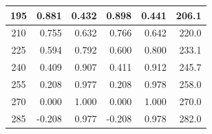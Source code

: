 \begin{table}[htbp]
\begin{center}
\begin{tabular}{|p{15 mm}|p{15 mm}|p{15 mm}|p{15 mm}|p{15 mm}|p{15 mm}|}
            \multicolumn{1}{|c|}{195}                  & \multicolumn{1}{|r|}{0.881}                                   & \multicolumn{1}{|r|}{0.432}                                   & \multicolumn{1}{|r|}{0.898}                & \multicolumn{1}{|r|}{0.441}                & \multicolumn{1}{|r|}{206.1}                    \\ \hline
            \multicolumn{1}{|c|}{210}                  & \multicolumn{1}{|r|}{0.755}                                   & \multicolumn{1}{|r|}{0.632}                                   & \multicolumn{1}{|r|}{0.766}                & \multicolumn{1}{|r|}{0.642}                & \multicolumn{1}{|r|}{220.0}                    \\ \hline
            \multicolumn{1}{|c|}{225}                  & \multicolumn{1}{|r|}{0.594}                                   & \multicolumn{1}{|r|}{0.792}                                   & \multicolumn{1}{|r|}{0.600}                & \multicolumn{1}{|r|}{0.800}                & \multicolumn{1}{|r|}{233.1}                    \\ \hline
            \multicolumn{1}{|c|}{240}                  & \multicolumn{1}{|r|}{0.409}                                   & \multicolumn{1}{|r|}{0.907}                                   & \multicolumn{1}{|r|}{0.411}                & \multicolumn{1}{|r|}{0.912}                & \multicolumn{1}{|r|}{245.7}                    \\ \hline
            \multicolumn{1}{|c|}{255}                  & \multicolumn{1}{|r|}{0.208}                                   & \multicolumn{1}{|r|}{0.977}                                   & \multicolumn{1}{|r|}{0.208}                & \multicolumn{1}{|r|}{0.978}                & \multicolumn{1}{|r|}{258.0}                    \\ \hline
            \multicolumn{1}{|c|}{270}                  & \multicolumn{1}{|r|}{0.000}                                   & \multicolumn{1}{|r|}{1.000}                                   & \multicolumn{1}{|r|}{0.000}                & \multicolumn{1}{|r|}{1.000}                & \multicolumn{1}{|r|}{270.0}                    \\ \hline
            \multicolumn{1}{|c|}{285}                  & \multicolumn{1}{|r|}{-0.208}                                  & \multicolumn{1}{|r|}{0.977}                                   & \multicolumn{1}{|r|}{-0.208}               & \multicolumn{1}{|r|}{0.978}                & \multicolumn{1}{|r|}{282.0}                    \\ \hline

\end{tabular}
\end{center}
\end{table}
